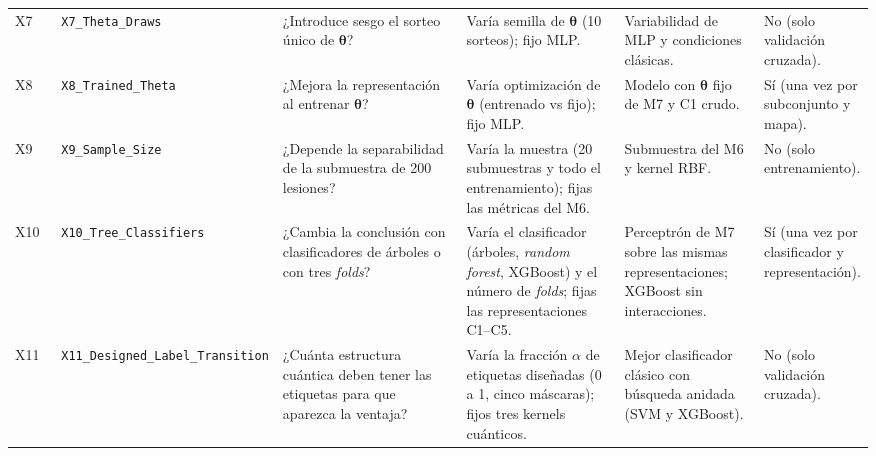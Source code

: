 \begin{table}[htbp]
\begin{adjustbox}{max width=\linewidth}
\begin{tabular}{p{0.06\linewidth} p{0.22\linewidth} p{0.28\linewidth} p{0.22\linewidth} p{0.18\linewidth} p{0.14\linewidth}}
X7 & \texttt{X7\_Theta\_}\allowbreak\texttt{Draws} & ¿Introduce sesgo el sorteo único de $\boldsymbol\theta$? & Varía semilla de $\boldsymbol\theta$ (10 sorteos); fijo MLP. & Variabilidad de MLP y condiciones clásicas. & No (solo validación cruzada). \\
X8 & \texttt{X8\_Trained\_}\allowbreak\texttt{Theta} & ¿Mejora la representación al entrenar $\boldsymbol\theta$? & Varía optimización de $\boldsymbol\theta$ (entrenado vs fijo); fijo MLP. & Modelo con $\boldsymbol\theta$ fijo de M7 y C1 crudo. & Sí (una vez por subconjunto y mapa). \\
X9 & \texttt{X9\_Sample\_}\allowbreak\texttt{Size} & ¿Depende la separabilidad de la submuestra de 200 lesiones? & Varía la muestra (20 submuestras y todo el entrenamiento); fijas las métricas del M6. & Submuestra del M6 y kernel RBF. & No (solo entrenamiento). \\
X10 & \texttt{X10\_Tree\_}\allowbreak\texttt{Classifiers} & ¿Cambia la conclusión con clasificadores de árboles o con tres \textit{folds}? & Varía el clasificador (árboles, \textit{random forest}, XGBoost) y el número de \textit{folds}; fijas las representaciones C1--C5. & Perceptrón de M7 sobre las mismas representaciones; XGBoost sin interacciones. & Sí (una vez por clasificador y representación). \\
X11 & \texttt{X11\_Designed\_}\allowbreak\texttt{Label\_Transition} & ¿Cuánta estructura cuántica deben tener las etiquetas para que aparezca la ventaja? & Varía la fracción $\alpha$ de etiquetas diseñadas (0 a 1, cinco máscaras); fijos tres kernels cuánticos. & Mejor clasificador clásico con búsqueda anidada (SVM y XGBoost). & No (solo validación cruzada). \\
\bottomrule
\end{tabular}
\end{adjustbox}
\end{table}

